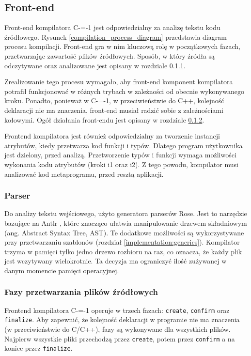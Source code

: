 \subsection{Front-end}
Front-end kompilatora C-=-1 jest odpowiedzialny za analizę tekstu kodu źródłowego. Rysunek \ref{compilation_process_diagram} przedstawia diagram procesu kompilacji.
Front-end gra w nim kluczową rolę w początkowych fazach, przetwarzając zawartość plików źródłowych.
Sposób, w który źródła są odczytywane oraz analizowane jest opisany w rozdziale \ref{implementation:parser}.

Zrealizowanie tego procesu wymagało, aby front-end komponent kompilatora potrafił funkcjonować w różnych trybach w zależności od obecnie wykonywanego kroku.
Ponadto, ponieważ w C-=-1, w przeciwieństwie do C++, kolejność deklaracji nie ma znaczenia, front-end musiał radzić sobie z zależnościami kołowymi.
Ogół działania front-endu jest opisany w rozdziale \ref{implementation:source_processing_phases}.

Frontend kompilatora jest również odpowiedzialny za tworzenie instancji atrybutów, kiedy przetwarza kod funkcji i typów.
Dlatego program użytkownika jest dzielony, przed analizą.
Przetworzenie typów i funkcji wymaga możliwości wykonania kodu atrybutów (kroki i1 oraz i2).
Z tego powodu, kompilator musi analizować kod metaprogramu, przed resztą aplikacji.

\subsubsection{Parser}
\label{implementation:parser}
Do analizy tekstu wejściowego, użyto generatora parserów Rose\cite{grabski2020}.
Jest to narzędzie bazujące na Antlr \cite{antlr}, które znacząco ułatwia manipulowanie drzewem składniowym (ang. Abstract Syntax Tree, AST).
Te dodatkowe możliwości są wykorzystywane przy przetwarzaniu szablonów (rozdział \ref{implementation:generics}).
Kompilator trzyma w pamięci tylko jedno drzewo rozbioru na raz, co oznacza, że każdy plik jest wczytywany wielokrotnie.
Ta decyzja ma ograniczyć ilość zużywanej w danym momencie pamięci operacyjnej.

\subsubsection{Fazy przetwarzania plików źródłowych}
\label{implementation:source_processing_phases}

Frontend kompilatora C-=-1 operuje w trzech fazach: \lstinline{create}, \lstinline{confirm} oraz \lstinline{finalize}.
Aby zapewnić, że kolejność deklaracji w programie nie ma znaczenia (w przeciwieństwie do C/C++), fazy są wykonywane dla wszystkich plików.
Najpierw wszystkie pliki przechodzą przez \lstinline{create}, potem przez \lstinline{confirm} a na koniec przez \lstinline{finalize}.


